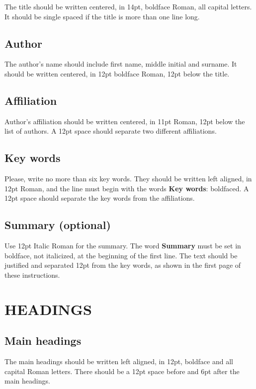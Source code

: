 \documentclass{coupled}
\begin{document}
The title should be written centered, in 14pt, boldface Roman, all
capital letters. It should be single spaced if the title is more
than one line long.

\subsection{Author}

The author's name should include first name, middle initial and
surname. It should be written centered, in 12pt boldface Roman,
12pt below the title.

\subsection{Affiliation}

Author's affiliation should be written centered, in 11pt Roman,
12pt below the list of authors. A 12pt space should separate two
different affiliations.

\subsection{Key words}

Please, write no more than six key words. They should be written
left aligned, in 12pt Roman, and the line must begin with the
words {\bf Key words}: boldfaced. A 12pt space should separate the
key words from the affiliations.

\subsection {Summary (optional)}

Use 12pt Italic Roman for the summary. The word {\bf Summary} must
be set in boldface, not italicized, at the beginning of the first
line. The text should be justified and separated 12pt from the key
words, as shown in the first page of these instructions.

\section{HEADINGS}

\subsection{Main headings}

The main headings should be written left aligned, in 12pt,
boldface and all capital Roman letters. There should be a 12pt
space before and 6pt after the main headings.
\end{document}
